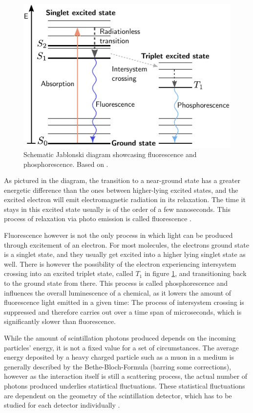 	\begin{figure}
		\centering
		\includegraphics[width=.7\textwidth]{pictures/jablonski.pdf}
		\caption{Schematic Jablonski diagram showcasing fluorescence and phosphorescence. Based on \cite{SCINTILLATION-TORRES}.}
		\label{fig:jablonski}
	\end{figure}

	
	As pictured in the diagram, the transition to a near-ground state has a greater energetic difference than the ones between higher-lying excited states, and the excited electron will emit electromagnetic radiation in its relaxation. The time it stays in this excited state usually is of the order of a few nanoseconds. This process of relaxation via photo emission is called fluorescence \cite{SCINTILLATION-TORRES}. %
	
	Fluorescence however is not the only process in which light can be produced through excitement of an electron. For most molecules, the electrons ground state is a singlet state, and they usually get excited into a higher lying singlet state as well. There is however the possibility of the electron experiencing intersystem crossing into an excited triplet state, called $T_1$ in figure \ref{fig:jablonski}, and transitioning back to the ground state from there. This process is called phosphorescence and influences the overall luminescence of a chemical, as it lowers the amount of fluorescence light emitted in a given time: The process of intersystem crossing is suppressed and therefore carries out over a time span of microseconds, which is significantly slower than fluorescence.
	
	While the amount of scintillation photons produced depends on the incoming particles' energy, it is not a fixed value for a set of circumstances. The average energy deposited by a heavy charged particle such as a muon in a medium is generally described by the Bethe-Bloch-Formula \cite{SCINTILLATION-TORRES} (barring some corrections), however as the interaction itself is still a scattering process, the actual number of photons produced underlies statistical fluctuations. 
	These statistical fluctuations are dependent on the geometry of the scintillation detector, which has to be studied for each detector individually \cite{GEOMETRIES}.
	
